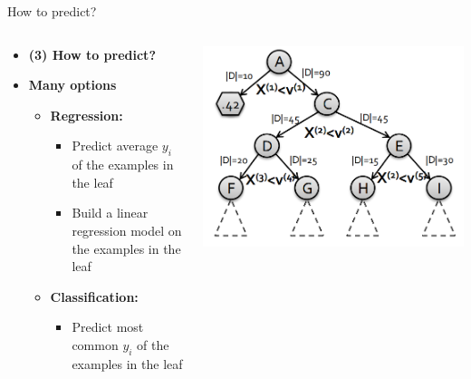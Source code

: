 \begin{frame}[allowframebreaks]{How to predict?}
    \begin{columns}
        \begin{column}{0.6\textwidth}
            \begin{itemize}
                \item \textbf{(3) How to predict?}
                \item \textbf{Many options}
                \begin{itemize}
                    \item \textbf{Regression:}
                    \begin{itemize}
                        \item Predict average $y_i$ of the examples in the leaf
                        \item Build a linear regression model on the examples in the leaf
                    \end{itemize}
                    \item \textbf{Classification:}
                    \begin{itemize}
                        \item Predict most common $y_i$ of the examples in the leaf
                    \end{itemize}
                \end{itemize}
            \end{itemize}
        \end{column}
        \begin{column}{0.4\textwidth}
            \includegraphics[width=\linewidth]{images/decision-trees/decision-trees-12.png}
        \end{column}
    \end{columns}
\end{frame}
